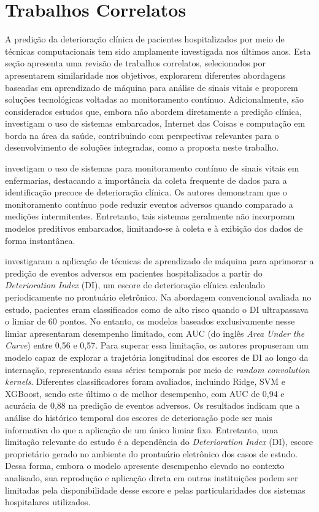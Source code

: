 \section{Trabalhos Correlatos}
\label{Correlatos}

A predição da deterioração clínica de pacientes hospitalizados por meio de técnicas computacionais tem sido amplamente investigada nos últimos anos. Esta seção apresenta uma revisão de trabalhos correlatos, selecionados por apresentarem similaridade nos objetivos, explorarem diferentes abordagens baseadas em aprendizado de máquina para análise de sinais vitais e proporem soluções tecnológicas voltadas ao monitoramento contínuo. Adicionalmente, são considerados estudos que, embora não abordem diretamente a predição clínica, investigam o uso de sistemas embarcados, Internet das Coisas e computação em borda na área da saúde, contribuindo com perspectivas relevantes para o desenvolvimento de soluções integradas, como a proposta neste trabalho.

 investigam o uso de sistemas para monitoramento contínuo de sinais vitais em enfermarias, destacando a importância da coleta frequente de dados para a identificação precoce de deterioração clínica. Os autores demonstram que o monitoramento contínuo pode reduzir eventos adversos quando comparado a medições intermitentes. Entretanto, tais sistemas geralmente não incorporam modelos preditivos embarcados, limitando-se à coleta e à exibição dos dados de forma instantânea.

 investigaram a aplicação de técnicas de aprendizado de máquina para aprimorar a predição de eventos adversos em pacientes hospitalizados a partir do \textit{Deterioration Index} (DI), um escore de deterioração clínica calculado periodicamente no prontuário eletrônico. Na abordagem convencional avaliada no estudo, pacientes eram classificados como de alto risco quando o DI ultrapassava o limiar de 60 pontos. No entanto, os modelos baseados exclusivamente nesse limiar apresentaram desempenho limitado, com AUC (do inglês \textit{Area Under the Curve}) entre 0,56 e 0,57. Para superar essa limitação, os autores propuseram um modelo capaz de explorar a trajetória longitudinal dos escores de DI ao longo da internação, representando essas séries temporais por meio de \textit{random convolution kernels}. Diferentes classificadores foram avaliados, incluindo Ridge, SVM e XGBoost, sendo este último o de melhor desempenho, com AUC de 0,94 e acurácia de 0,88 na predição de eventos adversos. Os resultados indicam que a análise do histórico temporal dos escores de deterioração pode ser mais informativa do que a aplicação de um único limiar fixo. Entretanto, uma limitação relevante do estudo é a dependência do \textit{Deterioration Index} (DI), escore proprietário gerado no ambiente do prontuário eletrônico dos casos de estudo. Dessa forma, embora o modelo apresente desempenho elevado no contexto analisado, sua reprodução e aplicação direta em outras instituições podem ser limitadas pela disponibilidade desse escore e pelas particularidades dos sistemas hospitalares utilizados.
 
